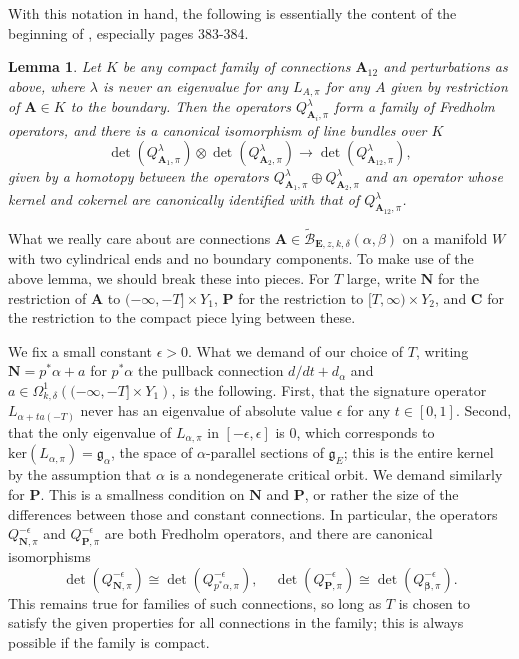 \documentclass{memo-l}
\newtheorem{lemma}[theorem]{Lemma}
\theoremstyle{definition}
\theoremstyle{remark}
\numberwithin{section}{chapter}
\numberwithin{equation}{chapter}
\begin{document}
With this notation in hand, the following is essentially the content of the beginning of \cite[Section~20.3]{KMSW}, especially pages 383-384.

\begin{lemma}\label{index-gluing}Let $K$ be any compact family of connections $\mathbf{A}_{12}$ and perturbations as above, where $\lambda$ is never an eigenvalue for any $L_{A,\pi}$ for any $A$ given by restriction of $\mathbf{A} \in K$ to the boundary. Then the operators $Q^\lambda_{\mathbf{A}_i,\pi}$ form a family of Fredholm operators, and there is a canonical isomorphism of line bundles over $K$
$$\det(Q^\lambda_{\mathbf{A}_1, \pi}) \otimes \det(Q^\lambda_{\mathbf{A}_2, \pi}) \to \det(Q^\lambda_{\mathbf{A}_{12},\pi}),$$ given by a homotopy between the operators $Q^\lambda_{\mathbf{A}_1, \pi} \oplus Q^\lambda_{\mathbf{A}_2, \pi}$ and an operator whose kernel and cokernel are canonically identified with that of $Q^\lambda_{\mathbf{A}_{12},\pi}$.
\end{lemma}

What we really care about are connections $\mathbf{A} \in \widetilde{\mathcal B}_{\mathbf{E},z,k,\delta}(\alpha, \beta)$ on a manifold $W$ with two cylindrical ends and no boundary components. To make use of the above lemma, we should break these into pieces. For $T$ large, write $\mathbf{N}$ for the restriction of $\mathbf{A}$ to $(-\infty, -T] \times Y_1$, $\mathbf{P}$ for the restriction to $[T, \infty) \times Y_2$, and $\mathbf{C}$ for the restriction to the compact piece lying between these.

We fix a small constant $\epsilon > 0$. What we demand of our choice of $T$, writing $\mathbf{N} = p^*\alpha + a$ for $p^*\alpha$ the pullback connection $d/dt + d_\alpha$ and $a \in \Omega^1_{k,\delta}\left( (-\infty, -T] \times Y_1\right)$, is the following. First, that the signature operator $L_{\alpha + t a(-T)}$ never has an eigenvalue of absolute value $\epsilon$ for any $t \in [0,1]$. Second, that the only eigenvalue of $L_{\alpha,\pi}$ in $[-\epsilon, \epsilon]$ is $0$, which corresponds to $\text{ker}(L_{\alpha, \pi}) = \mathfrak g_\alpha$, the space of $\alpha$-parallel sections of $\mathfrak g_E$; this is the entire kernel by the assumption that $\alpha$ is a nondegenerate critical orbit. We demand similarly for $\mathbf{P}$. This is a smallness condition on $\mathbf{N}$ and $\mathbf{P}$, or rather the size of the differences between those and constant connections. In particular, the operators $Q^{-\epsilon}_{\mathbf{N},\pi}$ and $Q^{-\epsilon}_{\mathbf{P},\pi}$ are both Fredholm operators, and there are canonical isomorphisms $$\det(Q_{\mathbf{N},\pi}^{-\epsilon}) \cong \det(Q_{p^*\alpha,\pi}^{-\epsilon}), \;\;\;\; \det(Q_{\mathbf{P},\pi}^{-\epsilon}) \cong \det(Q_{\mathbf{\beta},\pi}^{-\epsilon}).$$ This remains true for families of such connections, so long as $T$ is chosen to satisfy the given properties for all connections in the family; this is always possible if the family is compact.
\end{document}

